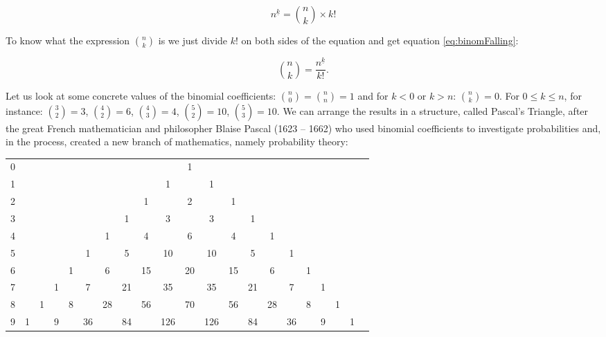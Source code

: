 \documentclass{scrreprt}
\begin{document}
\begin{equation}
n^{\underline{k}} = \binom{n}{k} \times k!
\end{equation}

To know what the expression $\binom{n}{k}$ is
we just divide $k!$ on both sides of the equation
and get equation \ref{eq:binomFalling}:

\begin{equation}
\binom{n}{k} = \frac{n^{\underline{k}}}{k!}.
\end{equation}

Let us look at some concrete values
of the binomial coefficients:
$\binom{n}{0} = \binom{n}{n} = 1$ and
for $k < 0$ or $k > n$: $\binom{n}{k} = 0$.
For $0 \le k \le n$, for instance:
$\binom{3}{2} = 3$, 
$\binom{4}{2} = 6$, 
$\binom{4}{3} = 4$, 
$\binom{5}{2} = 10$,
$\binom{5}{3} = 10$.
We can arrange the results
in a structure, called Pascal's Triangle, after the great
French mathematician and philosopher Blaise Pascal (1623 -- 1662)
who used binomial coefficients 
to investigate probabilities and,
in the process, created a new branch of mathematics,
namely probability theory:

\begin{tabular}{l c c c c c c c c c c c c c c c c c c c c}
0 &   &   &   &   &    &    &    &    &     &  1 &     &    &    &    &    &   &   &   &   &  \\
1 &   &   &   &   &    &    &    &    &   1 &    &   1 &    &    &    &    &   &   &   &   &  \\
2 &   &   &   &   &    &    &    &  1 &     &  2 &     &  1 &    &    &    &   &   &   &   &  \\
3 &   &   &   &   &    &    &  1 &    &   3 &    &   3 &    &  1 &    &    &   &   &   &   &  \\
4 &   &   &   &   &    &  1 &    &  4 &     &  6 &     &  4 &    &  1 &    &   &   &   &   &  \\
5 &   &   &   &   &  1 &    &  5 &    &  10 &    &  10 &    &  5 &    &  1 &   &   &   &   &  \\   
6 &   &   &   & 1 &    &  6 &    & 15 &     & 20 &     & 15 &    &  6 &    & 1 &   &   &   &  \\
7 &   &   & 1 &   &  7 &    & 21 &    &  35 &    &  35 &    & 21 &    &  7 &   & 1 &   &   &  \\
8 &   & 1 &   & 8 &    & 28 &    & 56 &     & 70 &     & 56 &    & 28 &    & 8 &   & 1 &   & \\
9 & 1 &   & 9 &   & 36 &    & 84 &    & 126 &    & 126 &    & 84 &    & 36 &   & 9 &   & 1
\end{tabular}
\end{document}
